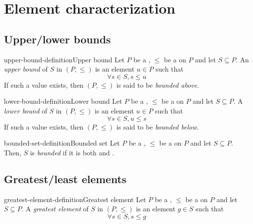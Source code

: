 \documentclass[preview]{standalone}
\begin{document}
\section{Element characterization}

\subsection{Upper/lower bounds}

\begin{snippetdefinition}{upper-bound-definition}{Upper bound}
    Let \(P\) be a \set, \(\leq\) be a \preorder on \(P\) and let \(S\subseteq P\).
    An \textit{upper bound} of \(S\) in \((P, \leq)\) is an element \(u\in P\) such that
    \[ \forall s\in S, s \leq u \]
    If such a value exists, then \((P, \leq)\) is said to be \textit{bounded above}.
\end{snippetdefinition}

\begin{snippetdefinition}{lower-bound-definition}{Lower bound}
    Let \(P\) be a \set, \(\leq\) be a \preorder on \(P\) and let \(S\subseteq P\).
    A \textit{lower bound} of \(S\) in \((P, \leq)\) is an element \(u\in P\) such that
    \[ \forall s\in S, u \leq s \]
    If such a value exists, then \((P, \leq)\) is said to be \textit{bounded below}.
\end{snippetdefinition}

\begin{snippetdefinition}{bounded-set-definition}{Bounded set}
    Let \(P\) be a \set, \(\leq\) be a \preorder on \(P\) and let \(S\subseteq P\).
    Then, \(S\) is \textit{bounded} if it is both  and
    .
\end{snippetdefinition}


\subsection{Greatest/least elements}

\begin{snippetdefinition}{greatest-element-definition}{Greatest element}
    Let \(P\) be a \set, \(\leq\) be a \preorder on \(P\) and let \(S\subseteq P\).
    A \textit{greatest element} of \(S\) in \((P, \leq)\) is an element \(g \in S\) such that
    \[ \forall s\in S, s \leq g \]
\end{snippetdefinition}
\end{document}
